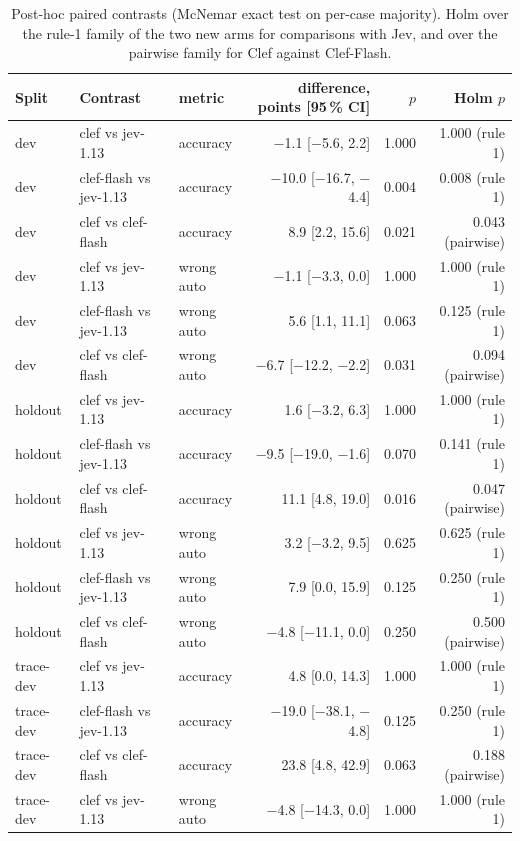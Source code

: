 \documentclass[11pt,letterpaper]{article}
\begin{document}
\begin{table}[tbp]
\centering\scriptsize
\caption{Post-hoc paired contrasts (McNemar exact test on per-case majority). Holm over the rule-1 family of the two
new arms for comparisons with Jev, and over the pairwise family for Clef against Clef-Flash.}
\label{vt:tab:clefcontrasts}
\begin{tabular*}{\textwidth}{@{\extracolsep{\fill}}l l l r r r@{}}
\toprule
Split & Contrast & metric & difference, points [95\,\% CI] & $p$ & Holm $p$ \\
\midrule
dev & clef vs jev-1.13 & accuracy & $-$1.1 [$-$5.6, 2.2] & 1.000 & 1.000 (rule 1) \\
dev & clef-flash vs jev-1.13 & accuracy & $-$10.0 [$-$16.7, $-$4.4] & 0.004 & 0.008 (rule 1) \\
dev & clef vs clef-flash & accuracy & 8.9 [2.2, 15.6] & 0.021 & 0.043 (pairwise) \\
dev & clef vs jev-1.13 & wrong auto & $-$1.1 [$-$3.3, 0.0] & 1.000 & 1.000 (rule 1) \\
dev & clef-flash vs jev-1.13 & wrong auto & 5.6 [1.1, 11.1] & 0.063 & 0.125 (rule 1) \\
dev & clef vs clef-flash & wrong auto & $-$6.7 [$-$12.2, $-$2.2] & 0.031 & 0.094 (pairwise) \\
\addlinespace[2pt]
holdout & clef vs jev-1.13 & accuracy & 1.6 [$-$3.2, 6.3] & 1.000 & 1.000 (rule 1) \\
holdout & clef-flash vs jev-1.13 & accuracy & $-$9.5 [$-$19.0, $-$1.6] & 0.070 & 0.141 (rule 1) \\
holdout & clef vs clef-flash & accuracy & 11.1 [4.8, 19.0] & 0.016 & 0.047 (pairwise) \\
holdout & clef vs jev-1.13 & wrong auto & 3.2 [$-$3.2, 9.5] & 0.625 & 0.625 (rule 1) \\
holdout & clef-flash vs jev-1.13 & wrong auto & 7.9 [0.0, 15.9] & 0.125 & 0.250 (rule 1) \\
holdout & clef vs clef-flash & wrong auto & $-$4.8 [$-$11.1, 0.0] & 0.250 & 0.500 (pairwise) \\
\addlinespace[2pt]
trace-dev & clef vs jev-1.13 & accuracy & 4.8 [0.0, 14.3] & 1.000 & 1.000 (rule 1) \\
trace-dev & clef-flash vs jev-1.13 & accuracy & $-$19.0 [$-$38.1, $-$4.8] & 0.125 & 0.250 (rule 1) \\
trace-dev & clef vs clef-flash & accuracy & 23.8 [4.8, 42.9] & 0.063 & 0.188 (pairwise) \\
trace-dev & clef vs jev-1.13 & wrong auto & $-$4.8 [$-$14.3, 0.0] & 1.000 & 1.000 (rule 1) \\

\end{tabular*}
\end{table}
\end{document}
